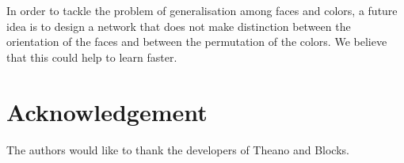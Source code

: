 \documentclass{article} %
\begin{document}
In order to tackle the problem of generalisation among faces and colors, a future idea is to design a network that does not make distinction between the orientation of the faces and between the permutation of the colors. We believe that this could help to learn faster.

\section{Acknowledgement}
The authors would like to thank the developers of Theano and Blocks.




\end{document}
